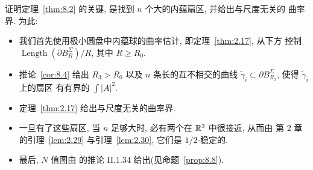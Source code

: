 证明定理~\ref{thm:8.2} 的关键, 是找到 $n$ 个大的内蕴扇区, 并给出与尺度无关的
曲率界. 为此:

\begin{itemize}
\item 我们首先使用极小圆盘中内蕴球的曲率估计, 即定理~\ref{thm:2.17}, 从下方
控制 $\operatorname{Length}(\partial B_R^\Sigma)/R$, 其中 $R\geq R_0$.
\item 推论~\ref{cor:8.4} 给出 $R_3>R_0$ 以及 $n$ 条长的互不相交的曲线
$\tilde\gamma_i\subset\partial B_{R_3}^\Sigma$, 使得 $\tilde\gamma_i$ 上的扇区
有有界的 $\int|A|^2$.
\item 定理~\ref{thm:2.17} 给出与尺度无关的曲率界.
\item 一旦有了这些扇区, 当 $n$ 足够大时, 必有两个在 $\mathbb{R}^3$ 中很接近, 从而由
第 2 章的引理~\ref{lem:2.29} 与引理~\ref{lem:2.30}, 它们是 $1/2$-稳定的.
\item 最后, $N$ 值图由 \cite{CM3} 的推论 II.1.34 给出(见命题~\ref{prop:8.8}).
\end{itemize}


